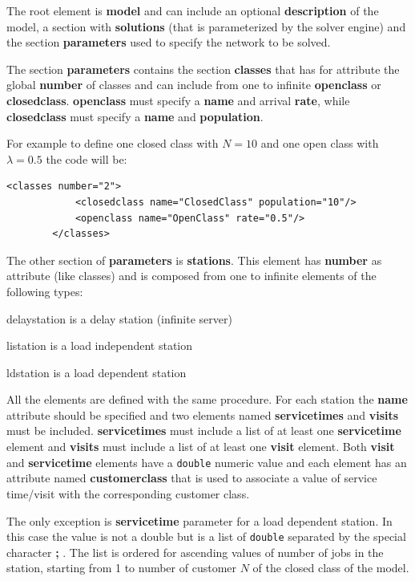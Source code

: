 The root element is \textbf{model} and can include an optional
\textbf{description} of the model, a section with \textbf{solutions}
(that is parameterized by the solver engine) and the section
\textbf{parameters} used to specify the network to be solved.

The section \textbf{parameters} contains the section
\textbf{classes} that has for attribute the global \textbf{number}
of classes and can include from one to infinite \textbf{openclass}
or \textbf{closedclass}. \textbf{openclass} must specify a
\textbf{name} and arrival \textbf{rate}, while \textbf{closedclass}
must specify a \textbf{name} and \textbf{population}.

For example to define one closed class with $N = 10$ and one open
class with $\lambda = 0.5$ the code will be:

\begin{lstlisting}[gobble=7]
        <classes number="2">
            <closedclass name="ClosedClass" population="10"/>
            <openclass name="OpenClass" rate="0.5"/>
        </classes>
\end{lstlisting}

The other section of \textbf{parameters} is \textbf{stations}. This
element has \textbf{number} as attribute (like classes) and is
composed from one to infinite elements of the following types:
\begin{description*}
    \item[delaystation] is a delay station (infinite server)
    \item[listation] is a load independent station
    \item[ldstation] is a load dependent station
\end{description*}
All the elements are defined with the same procedure. For each
station the \textbf{name} attribute should be specified and two
elements named \textbf{servicetimes} and \textbf{visits} must be
included. \textbf{servicetimes} must include a list of at least one
\textbf{servicetime} element and \textbf{visits} must include a list
of at least one \textbf{visit} element. Both \textbf{visit} and
\textbf{servicetime} elements have a \texttt{double} numeric value
and each element has an attribute named \textbf{customerclass} that
is used to associate a value of service time/visit with the
corresponding customer class.

The only exception is \textbf{servicetime} parameter for a load
dependent station. In this case the value is not a double but is a
list of \texttt{double} separated by the special character
\textbf{;} . The list is ordered for ascending values of number of
jobs in the station, starting from 1 to number of customer $N$ of
the closed class of the model.

